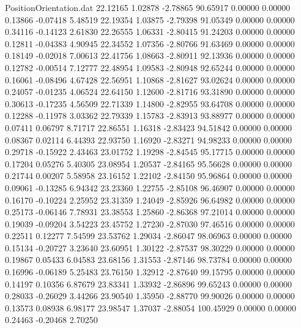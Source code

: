 \begin{filecontents}{PositionOrientation.dat}
  22.12165    1.02878   -2.78865    90.65917    0.00000    0.00000    0.13866   -0.07418    5.48519
  22.19354    1.03875   -2.79398    91.05349    0.00000    0.00000    0.34116   -0.14123    2.61830
  22.26555    1.06331   -2.80415    91.24203    0.00000    0.00000    0.12811   -0.04383    4.90945
  22.34552    1.07356   -2.80766    91.63469    0.00000    0.00000    0.18149   -0.02018    7.00613
  22.41756    1.08663   -2.80911    92.13936    0.00000    0.00000    0.12782   -0.00514    7.12777
  22.48954    1.09583   -2.80948    92.65244    0.00000    0.00000    0.16061   -0.08496    4.67428
  22.56951    1.10868   -2.81627    93.02624    0.00000    0.00000    0.24057   -0.01235    4.06524
  22.64150    1.12600   -2.81716    93.31890    0.00000    0.00000    0.30613   -0.17235    4.56509
  22.71339    1.14800   -2.82955    93.64708    0.00000    0.00000    0.12288   -0.11978    3.03362
  22.79339    1.15783   -2.83913    93.88977    0.00000    0.00000    0.07411    0.06797    8.71717
  22.86551    1.16318   -2.83423    94.51842    0.00000    0.00000    0.08367    0.02114    6.44393
  22.93750    1.16920   -2.83271    94.98233    0.00000    0.00000    0.29718   -0.15922    2.43463
  23.01752    1.19298   -2.84545    95.17715    0.00000    0.00000    0.17204    0.05276    5.40305
  23.08954    1.20537   -2.84165    95.56628    0.00000    0.00000    0.21744    0.00207    5.58958
  23.16152    1.22102   -2.84150    95.96864    0.00000    0.00000    0.09061   -0.13285    6.94342
  23.23360    1.22755   -2.85108    96.46907    0.00000    0.00000    0.16170   -0.10224    2.25952
  23.31359    1.24049   -2.85926    96.64982    0.00000    0.00000    0.25173   -0.06146    7.78931
  23.38553    1.25860   -2.86368    97.21014    0.00000    0.00000    0.19039   -0.09204    3.54223
  23.45752    1.27230   -2.87030    97.46516    0.00000    0.00000    0.22511    0.12277    7.54599
  23.53762    1.29034   -2.86047    98.06963    0.00000    0.00000    0.15134   -0.20727    3.23640
  23.60951    1.30122   -2.87537    98.30229    0.00000    0.00000    0.19867    0.05433    6.04583
  23.68156    1.31553   -2.87146    98.73784    0.00000    0.00000    0.16996   -0.06189    5.25483
  23.76150    1.32912   -2.87640    99.15795    0.00000    0.00000    0.14197    0.10356    6.87679
  23.83341    1.33932   -2.86896    99.65243    0.00000    0.00000    0.28033   -0.26029    3.44266
  23.90540    1.35950   -2.88770    99.90026    0.00000    0.00000    0.13573    0.08938    6.98177
  23.98547    1.37037   -2.88054   100.45929    0.00000    0.00000    0.24463   -0.20468    2.70250

\end{filecontents}
